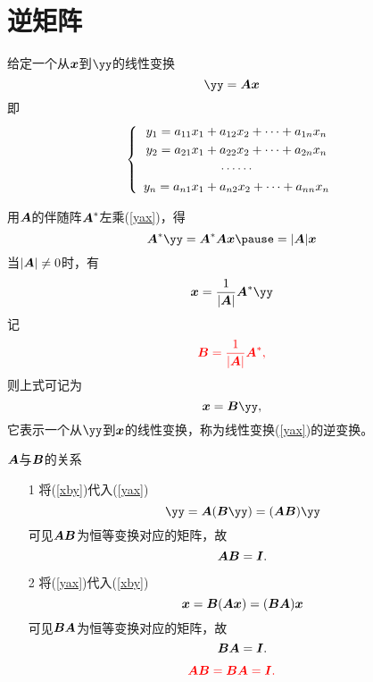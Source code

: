 \section{逆矩阵}

\begin{frame}
  \begin{footnotesize}
    给定一个从${\boldsymbol{x}}$到$\yy$的线性变换
    \begin{equation}\label{yax}
      \yy = \A \xx  
    \end{equation}       
    即
    $$
    \left\{
    \begin{array}{c}
      y_1 = a_{11}x_1 + a_{12}x_2 + \cdots + a_{1n}x_n\\[0.1cm]
      y_2 = a_{21}x_1 + a_{22}x_2 + \cdots + a_{2n}x_n\\[0.1cm]
      \cdots\cdots \\[0.1cm]
      y_n = a_{n1}x_1 + a_{n2}x_2 + \cdots + a_{nn}x_n
    \end{array}
    \right.
    $$
    \pause
    
    用$\boldsymbol{A}$的伴随阵$\boldsymbol{A}^*$左乘(\ref{yax})，得
    $$
    \A^* \yy = \A^* \A \xx \pause = |\A|\xx
    $$
    \pause
    当$|\boldsymbol{A}|\ne 0$时，有
    $$
    \xx = \frac{1}{|\A|}\A^* \yy
    $$
    \pause
    记
    $$
    \textcolor{red}{\boldsymbol{B} = \frac{1}{|\boldsymbol{A}|}\boldsymbol{A}^*,}
    $$
    则上式可记为
    \begin{equation}\label{xby}
      \xx = \B \yy,
    \end{equation}
    它表示一个从$\yy$到${\boldsymbol{x}}$的线性变换，称为线性变换(\ref{yax})的逆变换。
  \end{footnotesize}
\end{frame}



\begin{frame}
  \begin{footnotesize}
    \begin{block}{$\boldsymbol{A}$与$\boldsymbol{B}$的关系}
      \pause 
      \begin{itemize}
      \item[1] 将(\ref{xby})代入(\ref{yax})
        $$
        \yy = \A(\B\yy) = (\A\B)\yy
        $$
        可见$\boldsymbol{A}\boldsymbol{B}$为恒等变换对应的矩阵，故
        $$\boldsymbol{A}\boldsymbol{B}=\boldsymbol{I}.$$
        \pause
      \item[2] 将(\ref{yax})代入(\ref{xby})
        $$
        {\boldsymbol{x}} = \boldsymbol{B}(\boldsymbol{A}{\boldsymbol{x}}) = (\boldsymbol{B}\boldsymbol{A}){\boldsymbol{x}}
        $$
        可见$\boldsymbol{B}\boldsymbol{A}$为恒等变换对应的矩阵，故
        $$\boldsymbol{B}\boldsymbol{A}=\boldsymbol{I}.$$
      \end{itemize}
    \end{block}
    \pause 
    $$
    \textcolor{red}{
      \boldsymbol{A}\boldsymbol{B} = \boldsymbol{B}\boldsymbol{A} = \boldsymbol{I}.
    }
    $$

  \end{footnotesize}
\end{frame}


